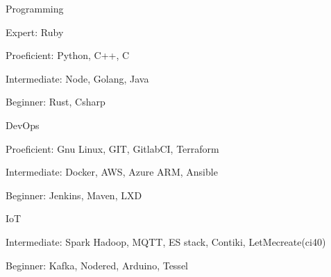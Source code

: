 

\begin{cvskills}

  \cvskill
    {Programming}
    {
      \begin{cvitems} %
        \item Expert:\hspace{8.3mm} Ruby
        \item Proeficient:\hspace{2.5mm} Python, C++, C
        \item Intermediate:              Node, Golang, Java
        \item Beginner:\hspace{5mm}      Rust, Csharp
      \end{cvitems}
    }
  \cvskill
    {DevOps} %
    {
      \begin{cvitems} %
        \item Proeficient:\hspace{2.5mm} Gnu Linux, GIT, GitlabCI, Terraform
        \item Intermediate:              Docker, AWS, Azure ARM, Ansible
        \item Beginner:\hspace{5mm}      Jenkins, Maven, LXD
      \end{cvitems}
    }

  \cvskill
    {IoT} %
    {
      \begin{cvitems} %
      \item Intermediate:             Spark Hadoop, MQTT, ES stack, Contiki, LetMecreate(ci40)
      \item Beginner:\hspace{5mm}     Kafka, Nodered, Arduino, Tessel
      \end{cvitems}
    }


\end{cvskills}
